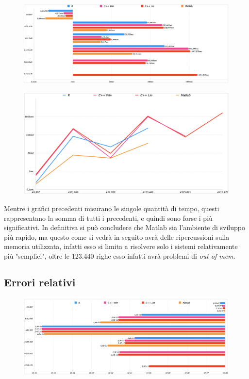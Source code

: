 \documentclass[preprint,12pt]{elsarticle}
\begin{document}
\begin{figure}[H]
	\centering
	\includegraphics[width=\linewidth]{total1}
\end{figure}

\begin{figure}[H]
	\centering
	\includegraphics[width=\linewidth]{total2}
\end{figure}

Mentre i grafici precedenti misurano le singole quantità di tempo, questi rappresentano la somma di tutti i precedenti, e quindi sono forse i più significativi.
In definitiva si può concludere che Matlab sia l'ambiente di sviluppo più rapido, ma questo come si vedrà in seguito avrà delle ripercussioni sulla memoria utilizzata, infatti esso si limita a risolvere solo i sistemi relativamente più "semplici", oltre le 123.440 righe esso infatti avrà problemi di \textit{out of mem}.

\subsection*{Errori relativi}

\begin{figure}[H]
	\centering
	\includegraphics[width=\linewidth]{errore1}
\end{figure}
\end{document}
